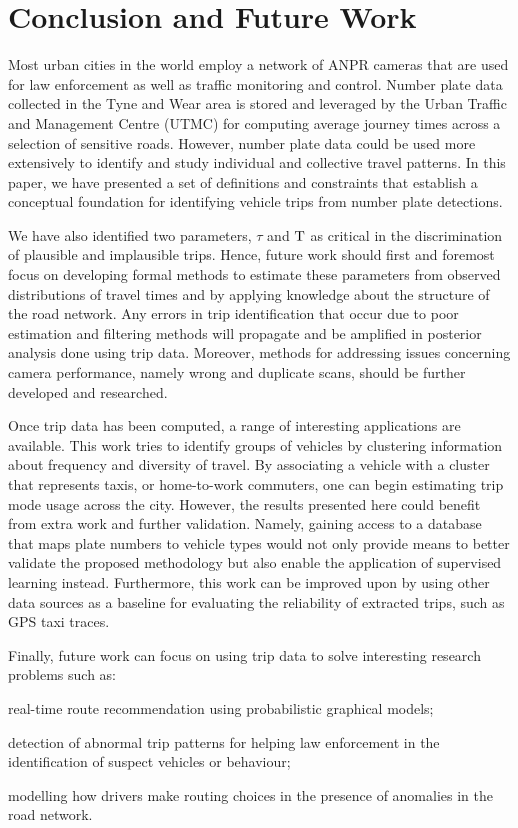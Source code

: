\section{Conclusion and Future Work}\label{s.conclusions}

Most urban cities in the world employ a network of ANPR cameras that are used for law enforcement as well as traffic monitoring and control. Number plate data collected in the Tyne and Wear area is stored and leveraged by the Urban Traffic and Management Centre (UTMC) for computing average journey times across a selection of sensitive roads. However, number plate data could be used more extensively to identify and study individual and collective travel patterns. In this paper, we have presented a set of definitions and constraints that establish a conceptual foundation for identifying vehicle trips from number plate detections.

We have also identified two parameters, $\tau$ and $\mathrm{T}$ as critical in the discrimination of plausible and implausible trips. Hence, future work should first and foremost focus on developing formal methods to estimate these parameters from observed distributions of travel times and by applying knowledge about the structure of the road network. Any errors in trip identification that occur due to poor estimation and filtering methods will propagate and be amplified in posterior analysis done using trip data. Moreover, methods for addressing issues concerning camera performance, namely wrong and duplicate scans, should be further developed and researched.

Once trip data has been computed, a range of interesting applications are available. This work tries to identify groups of vehicles by clustering information about frequency and diversity of travel. By associating a vehicle with a cluster that represents taxis, or home-to-work commuters, one can begin estimating trip mode usage across the city. However, the results presented here could benefit from extra work and further validation. Namely, gaining access to a database that maps plate numbers to vehicle types would not only provide means to better validate the proposed methodology but also enable the application of supervised learning instead. Furthermore, this work can be improved upon by using other data sources as a baseline for evaluating the reliability of extracted trips, such as GPS taxi traces.

Finally, future work can focus on using trip data to solve interesting research problems such as:
\begin{enumerate*}[label=(\roman*)]
  \item real-time route recommendation using probabilistic graphical models;
  \item detection of abnormal trip patterns for helping law enforcement in the identification of suspect vehicles or behaviour;
  \item modelling how drivers make routing choices in the presence of anomalies in the road network.
\end{enumerate*}

